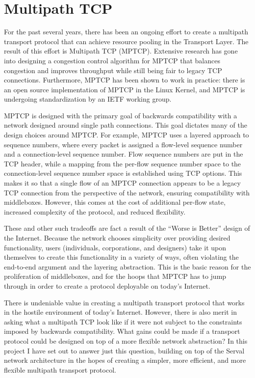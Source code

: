 \section{Multipath TCP}
\label{sec:mptcp}

For the past several years, there has been an ongoing effort to create a multipath transport protocol that can achieve resource pooling in the Transport Layer. The result of this effort is Multipath TCP (MPTCP). Extensive research has gone into designing a congestion control algorithm for MPTCP that balances congestion and improves throughput while still being fair to legacy TCP connections\cite{raiciu2009practical}\cite{wischik2009control}\cite{wischik2011design}. Furthermore, MPTCP has been shown to work in practice: there is an open source implementation of MPTCP in the Linux Kernel\cite{raiciu2012hard}, and MPTCP is undergoing standardization by an IETF working group\cite{mptcpcharter}.

MPTCP is designed with the primary goal of backwards compatibility with a network designed around single path connections\cite{mptcpcharter}. This goal dictates many of the design choices around MPTCP. For example, MPTCP uses a layered approach to sequence numbers, where every packet is assigned a flow-level sequence number and a connection-level sequence number. Flow sequence numbers are put in the TCP header, while a mapping from the per-flow sequence number space to the connection-level sequence number space is established using TCP options\cite{raiciu2012hard}. This makes it so that a single flow of an MPTCP connection appears to be a legacy TCP connection from the perspective of the network, ensuring compatibility with middleboxes. However, this comes at the cost of additional per-flow state, increased complexity of the protocol, and reduced flexibility.

These and other such tradeoffs are fact a result of the ``Worse is Better'' design of the Internet. Because the network chooses simplicity over providing desired functionality, users (individuals, corporations, and designers) take it upon themselves to create this functionality in a variety of ways, often violating the end-to-end argument and the layering abstraction. This is the basic reason for the proliferation of middleboxes, and for the hoops that MPTCP has to jump through in order to create a protocol deployable on today's Internet.

There is undeniable value in creating a multipath transport protocol that works in the hostile environment of today's Internet. However, there is also merit in asking what a multipath TCP look like if it were not subject to the constraints imposed by backwards compatibility. What gains could be made if a transport protocol could be designed on top of a more flexible network abstraction? In this project I have set out to answer just this question, building on top of the Serval network architecture in the hopes of creating a simpler, more efficient, and more flexible multipath transport protocol.